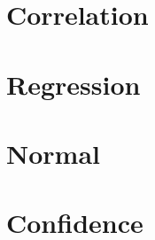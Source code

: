 \documentclass[12pt]{article}
\begin{document}
				
				\newpage
				

				
				\newpage
				

				
				\newpage
				

				
				\newpage
				

				
			\newpage
			\section{Correlation}

			
				\newpage
				

				
				\newpage
				

				
				\newpage
				

				
				\newpage
				

				
				\newpage
				

				
			\newpage
			\section{Regression}

			
				\newpage
				

				
				\newpage
				

				
				\newpage
				

				
				\newpage
				

				
				\newpage
				

				
			\newpage
			\section{Normal}

			
				\newpage
				

				
				\newpage
				

				
				\newpage
				

				
				\newpage
				

				
				\newpage
				

				
			\newpage
			\section{Confidence}

			
				\newpage
				

				
				\newpage
				

				
				\newpage
				

				
				\newpage
				

				
				\newpage
				

				
\end{document}
